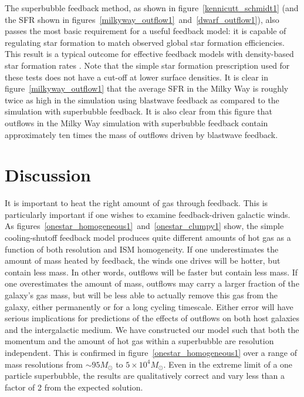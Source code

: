 The superbubble feedback method, as shown in figure~\ref{kennicutt_schmidt1} (and
the SFR shown in figures~\ref{milkyway_outflow1}~and~\ref{dwarf_outflow1}), also
passes the most basic requirement for a useful feedback model:  it is capable of
regulating star formation to match observed global star formation efficiencies.
This result is a typical outcome for effective feedback models with density-based 
star formation rates \citep[e.g.][]{Springel2003}.
Note that the simple star formation prescription used for
these tests does not have a cut-off at lower surface densities.  It is clear in
figure~\ref{milkyway_outflow1} that the average SFR in the Milky Way is roughly
twice as high in the simulation using blastwave feedback as compared to the
simulation with superbubble feedback.  It is also clear from this figure that
outflows in the Milky Way simulation with superbubble feedback contain
approximately ten times the mass of outflows driven by blastwave feedback.

\section{Discussion}

It is important to heat the right amount of gas through feedback. This is
particularly important if one wishes to examine feedback-driven galactic winds.
As figures~\ref{onestar_homogeneous1}~and~\ref{onestar_clumpy1} show, the simple
cooling-shutoff feedback model produces quite different amounts of hot gas as a
function of both resolution and ISM homogeneity.  If one underestimates the
amount of mass heated by feedback, the winds one drives will be hotter, but
contain less mass.  In other words, outflows will be faster but contain less
mass.  If one overestimates the amount of mass, outflows may carry a larger
fraction of the galaxy's gas mass, but will be less able to actually remove
this gas from the galaxy, either permanently or for a long cycling timescale.
Either error will have  serious implications for predictions of the effects of
outflows on both host galaxies and the intergalactic medium.  We have
constructed our model such that both the momentum and the amount of hot gas
within a superbubble are resolution independent.  This is confirmed in
figure~\ref{onestar_homogeneous1} over a range of mass 
resolutions from $\sim95M_\odot$ to $5\times10^4M_\odot$.  
Even in the extreme limit of a one particle superbubble,
the results are qualitatively correct and vary less than a factor of 2
from the expected solution.

